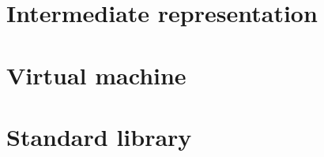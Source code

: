 \documentclass[10pt,a4paper]{article}
\begin{document}
\section{Intermediate representation}

\section{Virtual machine}

\section{Standard library}
\end{document}
